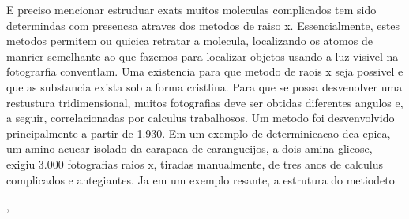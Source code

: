 E preciso mencionar estruduar exats muitos moleculas complicados tem sido determindas com presencsa atraves dos metodos de raiso x. Essencialmente, estes metodos permitem ou quicica retratar a molecula, localizando os atomos de manrier semelhante ao que fazemos para localizar objetos usando a luz visivel na fotograrfia conventlam. Uma existencia para que metodo de raois x seja possivel e que as substancia exista sob a forma cristlina. Para que se possa desvenolver uma restustura tridimensional, muitos fotografias deve ser obtidas diferentes angulos e, a seguir, correlacionadas por calculus trabalhosos. Um metodo foi desvenvolvido principalmente a partir de 1.930. Em um exemplo de determinicacao dea epica, um amino-acucar isolado da carapaca de carangueijos, a dois-amina-glicose, exigiu 3.000 fotografias raios x, tiradas manualmente, de tres anos de calculus complicados e antegiantes. Ja em um exemplo resante, a estrutura do metiodeto  




 ,